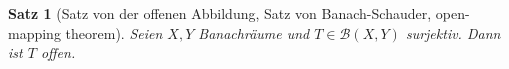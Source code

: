 \documentclass[ngerman]{report}
\theoremstyle{plain}%
\newtheorem{thm}{Satz}[chapter]
\theoremstyle{definition}%
\theoremstyle{myStyle}
\newcommand{\N}{\mathbb{N}}
\newcommand{\BS}[1][X,Y]{\mathcal{B}(#1)} %
\newcommand{\norm}[1]{\|#1\|}
\newcommand{\df}[1][]{%
	\overset{#1}{\Rightarrow}
}
\newcommand{\TODO}{\text{$\mathbb{TODO}$}}
\begin{document}
	\begin{thm}[Satz von der offenen Abbildung, Satz von Banach-Schauder, open-mapping theorem]
		Seien $X,Y$ Banachräume und $T\in \BS$ surjektiv. Dann ist $T$ offen.	
	\end{thm}
%		
%		 
\end{document}
